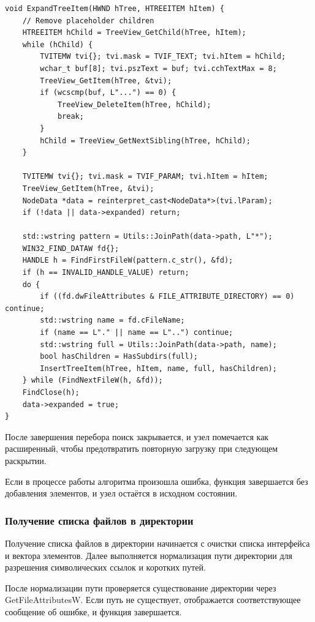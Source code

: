 \begin{lstlisting}[style=CodeListing]
void ExpandTreeItem(HWND hTree, HTREEITEM hItem) {
    // Remove placeholder children
    HTREEITEM hChild = TreeView_GetChild(hTree, hItem);
    while (hChild) {
        TVITEMW tvi{}; tvi.mask = TVIF_TEXT; tvi.hItem = hChild;
        wchar_t buf[8]; tvi.pszText = buf; tvi.cchTextMax = 8;
        TreeView_GetItem(hTree, &tvi);
        if (wcscmp(buf, L"...") == 0) {
            TreeView_DeleteItem(hTree, hChild);
            break;
        }
        hChild = TreeView_GetNextSibling(hTree, hChild);
    }

    TVITEMW tvi{}; tvi.mask = TVIF_PARAM; tvi.hItem = hItem; 
    TreeView_GetItem(hTree, &tvi);
    NodeData *data = reinterpret_cast<NodeData*>(tvi.lParam);
    if (!data || data->expanded) return;

    std::wstring pattern = Utils::JoinPath(data->path, L"*");
    WIN32_FIND_DATAW fd{};
    HANDLE h = FindFirstFileW(pattern.c_str(), &fd);
    if (h == INVALID_HANDLE_VALUE) return;
    do {
        if ((fd.dwFileAttributes & FILE_ATTRIBUTE_DIRECTORY) == 0) continue;
        std::wstring name = fd.cFileName;
        if (name == L"." || name == L"..") continue;
        std::wstring full = Utils::JoinPath(data->path, name);
        bool hasChildren = HasSubdirs(full);
        InsertTreeItem(hTree, hItem, name, full, hasChildren);
    } while (FindNextFileW(h, &fd));
    FindClose(h);
    data->expanded = true;
}
\end{lstlisting}

После завершения перебора поиск закрывается, и узел
помечается как расширенный, чтобы предотвратить повторную
загрузку при следующем раскрытии.

Если в процессе работы алгоритма произошла ошибка, функция
завершается без добавления элементов, и узел остаётся в
исходном состоянии.

\subsubsection{Получение списка файлов в директории}

Получение списка файлов в директории начинается с очистки
списка интерфейса и вектора элементов. Далее выполняется
нормализация пути директории для разрешения символических
ссылок и коротких путей.

После нормализации пути проверяется существование директории
через GetFileAttributesW. Если путь не существует,
отображается соответствующее сообщение об ошибке, и функция
завершается.

